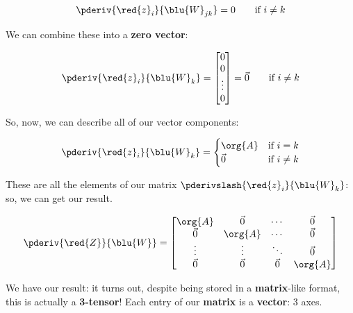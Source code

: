         \begin{equation}
            \pderiv{ \red{z}_i }{ \blu{W}_{jk} } = 0 
            \qquad
            \text{if } i \neq k
        \end{equation}
        
        We can combine these into a \textbf{zero vector}:
        
        \begin{equation}
            \pderiv{ \red{z}_i }{ \blu{W}_{k} } = 
            \begin{bmatrix}
                0\\0\\ \vdots \\ 0
            \end{bmatrix}
            =
            \vec{0}
            \qquad
            \text{if } i \neq k
        \end{equation}
        
        So, now, we can describe all of our vector components:
        
        \begin{equation}
            \pderiv{ \red{z}_i }{ \blu{W}_{k} } = 
            \begin{cases}
              \org{A} & \text{if } i = k\\
              \vec{0} & \text{if } i \neq k
            \end{cases}
        \end{equation}
        
        These are all the elements of our matrix $\pderivslash{ \red{z}_i }{ \blu{W}_{k} }$: so, we can get our result.
        
        \begin{equation}
            \pderiv{ \red{Z} }{ \blu{W} } 
            =
            \begin{bmatrix}
                \org{A} & \vec{0} & \cdots  & \vec{0} \\
                \vec{0} & \org{A} & \cdots  & \vec{0} \\
                \vdots  & \vdots  & \ddots  & \vec{0} \\
                \vec{0} & \vec{0} & \vec{0} & \org{A}
            \end{bmatrix}
        \end{equation}
        
        We have our result: it turns out, despite being stored in a \textbf{matrix}-like format, this is actually a \textbf{3-tensor}! Each entry of our \textbf{matrix} is a \textbf{vector}: 3 axes.
        
